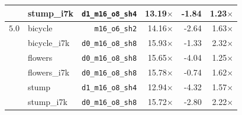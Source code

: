 \begin{table}[t]
\begin{tabular}{rlrrrr}
 & stump\_i7k & \texttt{d1\_m16\_o8\_sh4} & 13.19$\times$ & -1.84 & 1.23$\times$ \\
\midrule
$5.0$ & bicycle & \texttt{m16\_o6\_sh2} & 14.16$\times$ & -2.64 & 1.63$\times$ \\
 & bicycle\_i7k & \texttt{d0\_m16\_o8\_sh8} & 15.93$\times$ & -1.33 & 2.32$\times$ \\
 & flowers & \texttt{d0\_m16\_o8\_sh8} & 15.65$\times$ & -4.04 & 1.25$\times$ \\
 & flowers\_i7k & \texttt{d0\_m16\_o8\_sh8} & 15.78$\times$ & -0.74 & 1.62$\times$ \\
 & stump & \texttt{d1\_m16\_o8\_sh4} & 12.94$\times$ & -4.32 & 1.57$\times$ \\
 & stump\_i7k & \texttt{d0\_m16\_o8\_sh8} & 15.72$\times$ & -2.80 & 2.22$\times$ \\
\bottomrule
\end{tabular}
\end{table}
